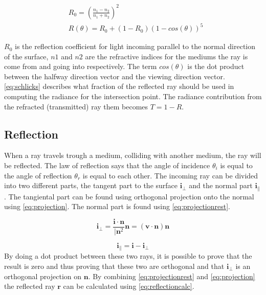 \documentclass[]{report}   %
\begin{document}
\begin{subequations} \label{eq:schlicks}
\begin{align}
	&R_0 = \left( \frac{n_1-n_2}{n_1+n_2} \right) ^2 \\
	&R(\theta) = R_0+ (1-R_0)(1-cos(\theta))^5
\end{align}
\end{subequations}

$R_0$ is the reflection coefficient for light incoming parallel to the normal direction of the surface, $n1$ and $n2$ are the refractive indices for the mediums the ray is come from and going into respectively.
The term $cos(\theta)$ is the dot product between the halfway direction vector and the viewing direction vector. \autoref{eq:schlicks} describes what fraction of the reflected ray should be used in computing the radiance for the intersection point. 
The radiance contribution from the refracted (transmitted) ray them becomes $T=1-R$.

\subsection{Reflection}
When a ray travels trough a medium, colliding with another medium, the ray will be reflected.
The law of reflection says that the angle of incidence $\theta_i$ is equal to the angle of reflection $ \theta_r $ is equal to each other.
The incoming ray can be divided into two different parts, the tangent part to the surface $ \mathbf{i}_\bot $ and the normal part $ \mathbf{i}_\| $.
The tangiental part can be found using orthogonal projection onto the normal using \autoref{eq:projection}. The normal part is found using \autoref{eq:projectionrest}.

\begin{equation} \label{eq:projection}
\mathbf{i}_\bot = \frac{\mathbf{i} \cdot \mathbf{n}} {\vert \mathbf{n}^2} \mathbf{n} = (\mathbf{v} \cdot \mathbf{n})\mathbf{n}
\end{equation}

\begin{equation} \label{eq:projectionrest}
\mathbf{i}_\| = \mathbf{i} - \mathbf{i}_\bot
\end{equation}
By doing a dot product between these two rays, it is possible to prove that the result is zero and thus proving that these two are orthogonal and that $ \mathbf{i}_\bot $ is an orthogonal projection on $ \mathbf{n} $. By combining \autoref{eq:projectionrest} and \autoref{eq:projection} the reflected ray $ \mathbf{r} $ can be calculated using \autoref{eq:reflectioncalc}.
\end{document}
